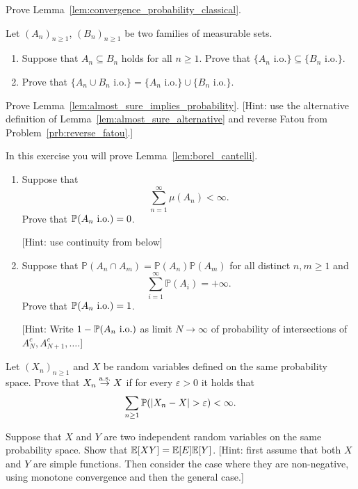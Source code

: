 \begin{problem}\label{prb:convergence_probability_classic}
Prove Lemma~\ref{lem:convergence_probability_classical}.
\end{problem}

\begin{problem}\label{prb:properties_io}
Let $(A_n)_{n \ge 1}$, $(B_n)_{n \ge 1}$ be two families of measurable sets. 
\begin{enumerate}[label={(\alph*)}]
\item Suppose that $A_n \subseteq B_n$ holds for all $n \ge 1$. Prove that $\{A_n \text{ i.o.}\} \subseteq \{B_n \text{ i.o.}\}$.
\item Prove that $\{A_n \cup B_n \text{ i.o.}\} = \{A_n \text{ i.o.}\} \cup \{B_n \text{ i.o.}\}$.
\end{enumerate}
\end{problem}

\begin{problem}\label{prb:almost_sure_implies_probability}
Prove Lemma~\ref{lem:almost_sure_implies_probability}. [Hint: use the alternative definition of Lemma~\ref{lem:almost_sure_alternative} and reverse Fatou from Problem~\ref{prb:reverse_fatou}.]
\end{problem}

\begin{problem}\label{prb:borel_cantelli}
In this exercise you will prove Lemma~\ref{lem:borel_cantelli}.

\begin{enumerate}[label={(\alph*)}]
\item Suppose that
\[
	\sum_{n=1}^\infty \mu(A_n) < \infty.
\]
Prove that $\mathbb P(A_n \text{ i.o.}) = 0$.

[Hint: use continuity from below]
\item Suppose that $\mathbb{P}(A_n \cap A_m) = \mathbb{P}(A_n) \mathbb{P}(A_m)$ for all distinct $n,m \ge 1$ and
\[
	\sum_{i=1}^\infty \mathbb{P}(A_i) = +\infty.
\]
Prove that $\mathbb P(A_n \text{ i.o.}) = 1$.

[Hint: Write $1- \mathbb P(A_n \text{ i.o.})$ as limit $N \to \infty$ of probability of intersections of $A_N^c, A_{N+1}^c, \dots$.] 
\end{enumerate}
\end{problem}

\begin{problem}
Let $(X_n)_{n \ge 1}$ and $X$ be random variables defined on the same probability space. Prove that $X_n \stackrel{\mathrm{a.s.}}{\rightarrow} X$ if for every $\varepsilon > 0$ it holds that
\[
	\sum_{n \ge 1} \mathbb P(|X_n - X| > \varepsilon) < \infty.
\]
\end{problem}

\begin{problem}\label{prb:expectation_independent_product}
Suppose that $X$ and $Y$ are two independent random variables on the same probability space. Show that $\mathbb E[XY] = \mathbb E[E]\mathbb E[Y]$.
[Hint: first assume that both $X$ and $Y$ are simple functions. Then consider the case where they are non-negative, using monotone convergence and then the general case.]


\end{problem}
